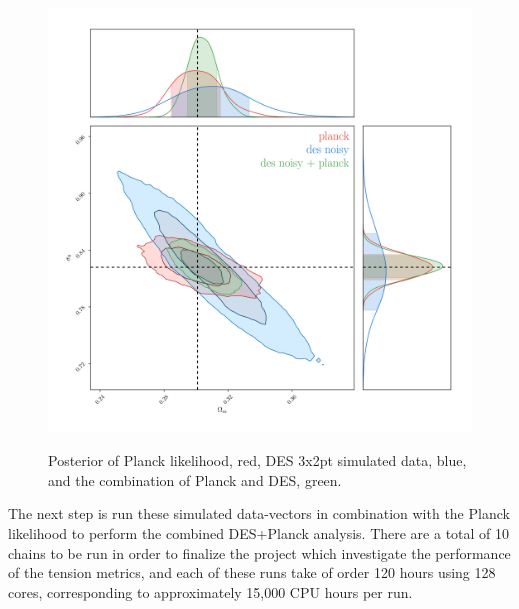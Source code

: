 \documentclass[12pt]{article}
\begin{document}
\begin{small}

\begin{figure}[h!]
\begin{center}
\includegraphics[height=12cm]{des+planck_poly2D.png}
\end{center}
 \caption{Posterior of Planck likelihood, red, DES 3x2pt simulated data, blue, and the combination of Planck and DES, green.}
\label{figure1}
\end{figure}

The next step is run these simulated data-vectors in combination with the Planck likelihood to perform the combined DES+Planck analysis. There are a total of 10 chains to be run in order to finalize the project which investigate the performance of the tension metrics, and each of these runs take of order 120 hours using 128 cores, corresponding to approximately 15,000 CPU hours per run.


\end{small}
\end{document}
